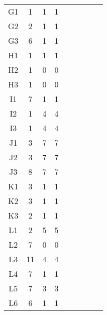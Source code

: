 \begin{center}
\begin{longtable}{ccccc|cccc}
G1    & 1     & 1     & 1 \\
G2    & 2     & 1     & 1 \\
G3    & 6     & 1     & 1 \\
H1    & 1     & 1     & 1 \\
H2    & 1     & 0     & 0 \\
H3    & 1     & 0     & 0 \\
I1    & 7     & 1     & 1 \\
I2    & 1     & 4     & 4 \\
I3    & 1     & 4     & 4 \\
J1    & 3     & 7     & 7 \\
J2    & 3     & 7     & 7 \\
J3    & 8     & 7     & 7 \\
K1    & 3     & 1     & 1 \\
K2    & 3     & 1     & 1 \\
K3    & 2     & 1     & 1 \\
L1    & 2     & 5     & 5 \\
L2    & 7     & 0     & 0 \\
L3    & 11    & 4     & 4 \\
L4    & 7     & 1     & 1 \\
L5    & 7     & 3     & 3 \\
L6    & 6     & 1     & 1 \\


\end{longtable}
\end{center}

